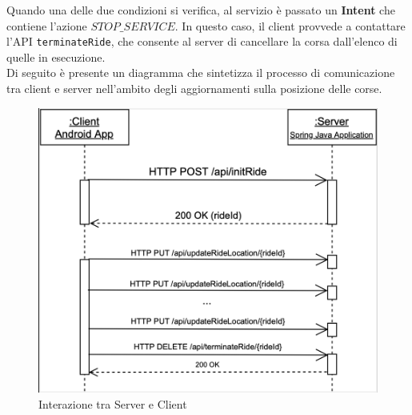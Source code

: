                             Quando una delle due condizioni si verifica, al servizio è passato un \textbf{Intent} che contiene l'azione \texttt{$STOP\_SERVICE$}. In questo caso, il client provvede a contattare l'API \texttt{terminateRide}, che consente al server di cancellare la corsa dall'elenco di quelle in esecuzione.\\
                    Di seguito è presente un diagramma che sintetizza il processo di comunicazione tra client e server nell'ambito degli aggiornamenti sulla posizione delle corse.

                    \begin{figure}[H]
                        \includegraphics[width=\columnwidth]{capitolo4/figure/clientServerInteraction.png}
                        \caption{Interazione tra Server e Client}
                        \label{fig: Interazione tra Server e Client}
                    \end{figure}


                        
